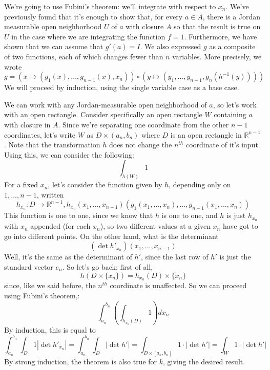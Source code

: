 \documentclass{article}
\newcommand{\reals}[0]{\mathbb{R}}
\begin{document}
\begin{itemize}
  We're going to use Fubini's theorem: we'll integrate with respect to \(x_n\). We've previously found that it's enough to show that, for every \(a \in A\), there is a Jordan measurable open neighborhood \(U\) of \(a\) with closure \(A\) so that the result is true on \(U\) in the case where we are integrating the function \(f = 1\). Furthermore, we have shown that we can assume that \(g'(a) = I\). We also expressed \(g\) as a composite of two functions, each of which changes fewer than \(n\) variables. More precisely, we wrote
  \begin{equation}
    g = (x \mapsto  (g_1(x),...,g_{n - 1}(x), x_n)) \circ (y \mapsto (y_1,...,y_{n - 1},g_n(h^{-1}(y))))
  \end{equation}
  We will proceed by induction, using the single variable case as a base case.

  We can work with any Jordan-measurable open neighborhood of \(a\), so let's work with an open rectangle. Consider specifically an open rectangle \(W\) containing \(a\) with closure in \(A\). Since we're separating one coordinate from the other \(n - 1\) coordinates, let's write \(W\) as \(D \times (a_n, b_n)\) where \(D\) is an open rectangle in \(\reals^{n - 1}\). Note that the transformation \(h\) does not change the \(n^{th}\) coordinate of it's input. Using this, we can consider the following:
  \begin{equation}
    \int_{h(W)}1
  \end{equation}
  For a fixed \(x_n\), let's consider the function given by \(h\), depending only on \(1,...,n - 1\), written
  \begin{equation}
    h_{x_n} : D \to \reals^{n - 1},
    h_{x_n}(x_1,...,x_{n - 1})(g_1(x_1,...,x_n),...,g_{n - 1}(x_1,...,x_n))
  \end{equation}
  This function is one to one, since we know that \(h\) is one to one, and \(h\) is just \(h_{x_n}\) with \(x_n\) appended (for each \(x_n\)), so two different values at a given \(x_n\) have got to go into different points. On the other hand, what is the determinant
  \begin{equation}
    (\det h'_{x_n})(x_1,...,x_{n - 1})
  \end{equation}
  Well, it's the same as the determinant of \(h'\), since the last row of \(h'\) is just the standard vector \(e_n\). So let's go back: first of all,
  \begin{equation}
    h(D \times \{x_n\}) = h_{x_n}(D) \times \{x_n\}
  \end{equation}
  since, like we said before, the \(n^{th}\) coordinate is unaffected. So we can proceed using Fubini's theorem,:
  \begin{equation}
    \int_{a_n}^{b_n}\left(\int_{h_{x_n}(D)}1\right)dx_n
  \end{equation}
  By induction, this is equal to
  \begin{equation}
    \int_{a_n}^{b_n}\int_D1|\det h'_{x_n}| = \int_{a_n}^{b_n}\int_D|\det h'| = \int_{D \times [a_n, b_n]}1 \cdot |\det h'| = \int_W 1 \cdot |\det h'|
  \end{equation}
  By strong induction, the theorem is also true for \(k\), giving the desired result.
\end{itemize}
\end{document}
